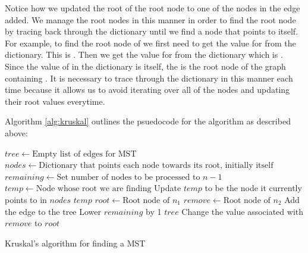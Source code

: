 \vspace{.25cm}

Notice how we updated the root of the root node to one of the nodes in the edge added.
We manage the root nodes in this manner in order to find the root node by tracing back through the dictionary until we find a node that points to itself.
For example, to find the root node of  we first need to get the value for  from the dictionary.  This is .
Then we get the value for  from the dictionary which is .
Since the value of  in the dictionary is itself, the  is the root node of the graph containing .
It is necessary to trace through the dictionary in this manner each time because it allows us to avoid iterating over all of the nodes and updating their root values everytime.


Algorithm \ref{alg:kruskal} outlines the psuedocode for the algorithm as described above:
\begin{algorithm}
\begin{algorithmic}[1]
	\State $tree \gets \text{Empty list of edges for MST}$
	\State $nodes \gets \text{Dictionary that points each node towards its root, initially itself}$
	\State $remaining \gets \text{Set number of nodes to be processed to } n-1$
	 
		\State $temp \gets \text{Node whose root we are finding}$
			\State Update $temp$ to be the node it currently points to in $nodes$
			\State {} $temp$
		\EndWhile
	\EndFunction
		\State $root \gets \text{Root node of } n_1$
		\State $remove \gets \text{Root node of } n_2$
			\State Add the edge to the tree
			\State Lower $remaining$ by 1
				\State {} $tree$
			\EndIf
			\State Change the value associated with $remove$ to $root$
		\EndIf
	\EndFor	
\EndProcedure
\end{algorithmic}
\caption{Kruskal's algorithm for finding a MST}
\label{alg:kruskal}
\end{algorithm}


